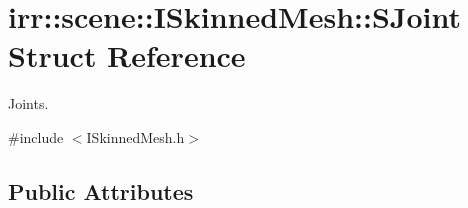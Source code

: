 \hypertarget{structirr_1_1scene_1_1ISkinnedMesh_1_1SJoint}{}\section{irr\+:\+:scene\+:\+:I\+Skinned\+Mesh\+:\+:S\+Joint Struct Reference}
\label{structirr_1_1scene_1_1ISkinnedMesh_1_1SJoint}


Joints.  




{\ttfamily \#include $<$I\+Skinned\+Mesh.\+h$>$}

\subsection*{Public Attributes}
